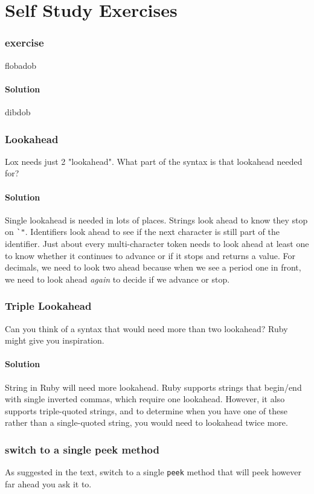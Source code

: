 \documentclass[twoside=false, DIV=14]{scrartcl}
\begin{document}
\part*{Self Study Exercises}
\section*{exercise}
flobadob

\subsection*{Solution}
dibdob


\section*{Lookahead}
Lox needs just 2 "lookahead". What part of the syntax is that lookahead needed for?

\subsection*{Solution}
Single lookahead is needed in lots of places. Strings look ahead to know they stop on \lstinline|`"|. Identifiers look ahead to see if the next character is still part of the identifier. Just about every multi-character token needs to look ahead at least one to know whether it continues to advance or if it stops and returns a value. For decimals, we need to look two ahead because when we see a period one in front, we need to look ahead \emph{again} to decide if we advance or stop.


\section*{Triple Lookahead}
Can you think of a syntax that would need more than two lookahead? Ruby might give you inspiration.

\subsection*{Solution}
String in Ruby will need more lookahead. Ruby supports strings that begin/end with single inverted commas, which require one lookahead. However, it also supports triple-quoted strings, and to determine when you have one of these rather than a single-quoted string, you would need to lookahead twice more.


\section*{switch to a single peek method}
  As suggested in the text, switch to a single \lstinline|peek| method that will peek however far ahead you ask it to.
\end{document}
